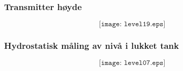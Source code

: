 \documentclass[aspectratio=169,xcolor=dvipsnames]{beamer}
\begin{document}
%
%
%
\begin{frame}
	\frametitle{Transmitter høyde}

	$$\texttt{[image: level19.eps]}$$
\end{frame}
%
%
%
%
%
%
%
%
%
\begin{frame}
	\frametitle{Hydrostatisk måling av nivå i lukket tank}

	$$\texttt{[image: level07.eps]}$$
\end{frame}
\end{document}

